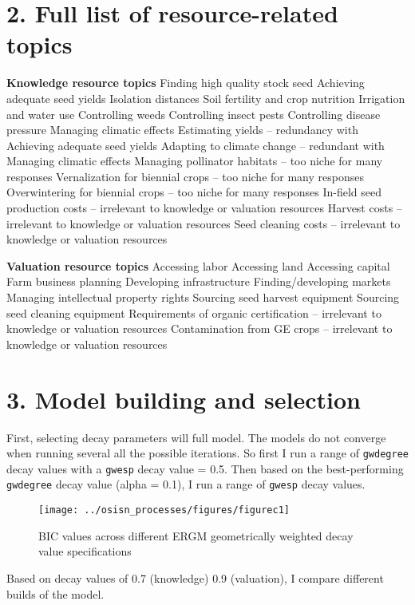 \documentclass[twoside,12pt,final]{ucthesis-CA2012}
\begin{document}
\begin{ucmainmatter}
{\section{2. Full list of resource-related topics}\label{full-list-of-resource-related-topics}}

\textbf{Knowledge resource topics}
Finding high quality stock seed
Achieving adequate seed yields
Isolation distances
Soil fertility and crop nutrition
Irrigation and water use
Controlling weeds
Controlling insect pests
Controlling disease pressure
Managing climatic effects
Estimating yields -- redundancy with Achieving adequate seed yields
Adapting to climate change -- redundant with Managing climatic effects
Managing pollinator habitats -- too niche for many responses
Vernalization for biennial crops -- too niche for many responses
Overwintering for biennial crops -- too niche for many responses
In-field seed production costs -- irrelevant to knowledge or valuation resources
Harvest costs -- irrelevant to knowledge or valuation resources
Seed cleaning costs -- irrelevant to knowledge or valuation resources

\textbf{Valuation resource topics}
Accessing labor
Accessing land
Accessing capital
Farm business planning
Developing infrastructure
Finding/developing markets
Managing intellectual property rights
Sourcing seed harvest equipment
Sourcing seed cleaning equipment
Requirements of organic certification -- irrelevant to knowledge or valuation resources
Contamination from GE crops -- irrelevant to knowledge or valuation resources

\hypertarget{model-building-and-selection}{%
\section{3. Model building and selection}\label{model-building-and-selection}}

First, selecting decay parameters will full model. The models do not converge when running several all the possible iterations. So first I run a range of \texttt{gwdegree} decay values with a \texttt{gwesp} decay value = 0.5. Then based on the best-performing \texttt{gwdegree} decay value (alpha = 0.1), I run a range of \texttt{gwesp} decay values.
\begin{figure}

{\centering \texttt{[image: ../osisn\_processes/figures/figurec1]} 

}

\caption{BIC values across different ERGM geometrically weighted decay value specifications}\label{fig:unnamed-chunk-41}
\end{figure}
Based on decay values of 0.7 (knowledge) 0.9 (valuation), I compare different builds of the model.
\begin{table}


\end{table}
\end{ucmainmatter}
\end{document}
